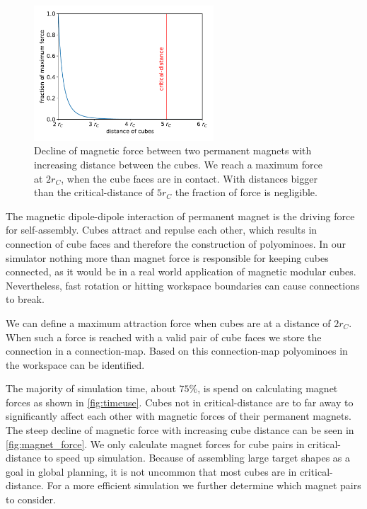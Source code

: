 \begin{figure}
	\centering
	\includegraphics[width=0.6\textwidth]{figures/plots/magnet_force.pdf}
	\caption[Declining magnetic forces with increasing cube distance.]{Decline of magnetic force between two permanent magnets with increasing distance between the cubes. We reach a maximum force at $2 r_C$, when the cube faces are in contact. With distances bigger than the critical-distance of $5 r_C$ the fraction of force is negligible.}
	\label{fig:magnet_force}
\end{figure}

The magnetic dipole-dipole interaction of permanent magnet is the driving force for self-assembly.
Cubes attract and repulse each other, which results in connection of cube faces and therefore the construction of polyominoes.
In our simulator nothing more than magnet force is responsible for keeping cubes connected, as it would be in a real world application of magnetic modular cubes.
Nevertheless, fast rotation or hitting workspace boundaries can cause connections to break.

We can define a maximum attraction force when cubes are at a distance of $2 r_C$.
When such a force is reached with a valid pair of cube faces we store the connection in a connection-map.
Based on this connection-map polyominoes in the workspace can be identified.

The majority of simulation time, about $75\%$, is spend on calculating magnet forces as shown in \autoref{fig:timeuse}.
Cubes not in critical-distance are to far away to significantly affect each other with magnetic forces of their permanent magnets.
The steep decline of magnetic force with increasing cube distance can be seen in \autoref{fig:magnet_force}.
We only calculate magnet forces for cube pairs in critical-distance to speed up simulation.
Because of assembling large target shapes as a goal in global planning, it is not uncommon that most cubes are in critical-distance.
For a more efficient simulation we further determine which magnet pairs to consider.

